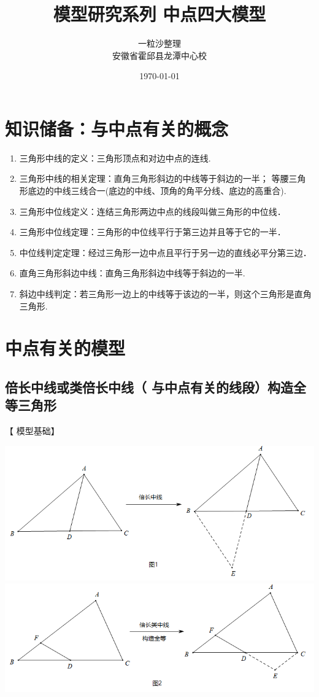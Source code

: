 \documentclass[10pt]{ctexart}
\title{模型研究系列 \quad 中点四大模型}
\author{一粒沙整理\\安徽省霍邱县龙潭中心校}
\date{\today}
\begin{document}
\maketitle
\tableofcontents


\section{知识储备：与中点有关的概念}
{\kaishu\color{blue}
\begin{enumerate}
	\item {\heiti\color{cyan}三角形中线的定义}：三角形顶点和对边中点的连线.
	\item {\heiti\color{cyan}三角形中线的相关定理}：直角三角形斜边的中线等于斜边的一半；
等腰三角形底边的中线三线合一(底边的中线、顶角的角平分线、底边的高重合).
	\item {\heiti\color{cyan}三角形中位线定义}：连结三角形两边中点的线段叫做三角形的中位线．
	\item {\heiti\color{cyan}三角形中位线定理}：三角形的中位线平行于第三边并且等于它的一半．
	\item {\heiti\color{cyan}中位线判定定理}：经过三角形一边中点且平行于另一边的直线必平分第三边．
	\item {\heiti\color{cyan}直角三角形斜边中线}：直角三角形斜边中线等于斜边的一半.
	\item {\heiti\color{cyan}斜边中线判定}：若三角形一边上的中线等于该边的一半，则这个三角形是直角三角形.
\end{enumerate}
}

\section{中点有关的模型}
\subsection{倍长中线或类倍长中线（ 与中点有关的线段）构造全等三角形}
【 {\heiti 模型基础}】

\begin{center}
	\includegraphics[scale=0.6]{figure/zhongdian01}\\
	\includegraphics[scale=0.6]{figure/zhongdian02}
\end{center}
\end{document}

